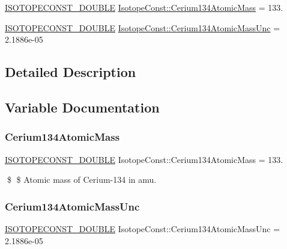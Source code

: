 \begin{DoxyCompactItemize}
\item 
\mbox{\hyperlink{group___isotope_const-_macros_ga8f45a7272ce02c0b4c65c44636ed719a}{I\+S\+O\+T\+O\+P\+E\+C\+O\+N\+S\+T\+\_\+\+D\+O\+U\+B\+LE}} \mbox{\hyperlink{group___isotope_const-_cerium-_ce134_gaf3818bbbedb600ccaa1f369f442d1a0d}{Isotope\+Const\+::\+Cerium134\+Atomic\+Mass}} = 133.
\item 
\mbox{\hyperlink{group___isotope_const-_macros_ga8f45a7272ce02c0b4c65c44636ed719a}{I\+S\+O\+T\+O\+P\+E\+C\+O\+N\+S\+T\+\_\+\+D\+O\+U\+B\+LE}} \mbox{\hyperlink{group___isotope_const-_cerium-_ce134_ga501f4b70124f4ea0ce958a78dd95bf9c}{Isotope\+Const\+::\+Cerium134\+Atomic\+Mass\+Unc}} = 2.\+1886e-\/05
\end{DoxyCompactItemize}


\subsection{Detailed Description}


\subsection{Variable Documentation}
\mbox{\label{group___isotope_const-_cerium-_ce134_gaf3818bbbedb600ccaa1f369f442d1a0d}} 
\subsubsection{\texorpdfstring{Cerium134\+Atomic\+Mass}{Cerium134AtomicMass}}
{\footnotesize\ttfamily \mbox{\hyperlink{group___isotope_const-_macros_ga8f45a7272ce02c0b4c65c44636ed719a}{I\+S\+O\+T\+O\+P\+E\+C\+O\+N\+S\+T\+\_\+\+D\+O\+U\+B\+LE}} Isotope\+Const\+::\+Cerium134\+Atomic\+Mass = 133.}

\$ \$ Atomic mass of Cerium-\/134 in amu. \mbox{\label{group___isotope_const-_cerium-_ce134_ga501f4b70124f4ea0ce958a78dd95bf9c}} 
\subsubsection{\texorpdfstring{Cerium134\+Atomic\+Mass\+Unc}{Cerium134AtomicMassUnc}}
{\footnotesize\ttfamily \mbox{\hyperlink{group___isotope_const-_macros_ga8f45a7272ce02c0b4c65c44636ed719a}{I\+S\+O\+T\+O\+P\+E\+C\+O\+N\+S\+T\+\_\+\+D\+O\+U\+B\+LE}} Isotope\+Const\+::\+Cerium134\+Atomic\+Mass\+Unc = 2.\+1886e-\/05}

